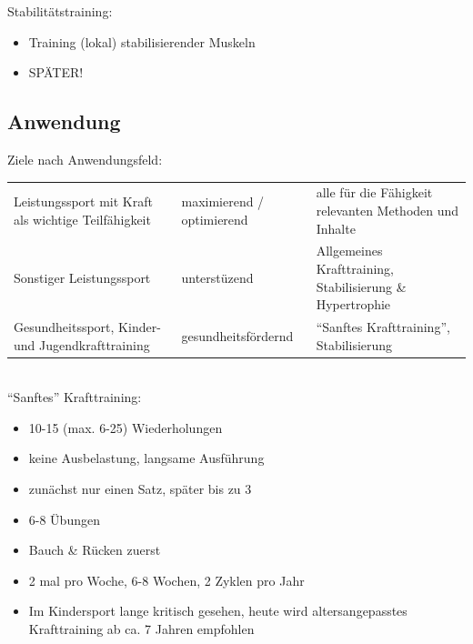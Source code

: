 Stabilitätstraining:
\begin{itemize}
    \item Training (lokal) stabilisierender Muskeln
    \item SPÄTER!
\end{itemize}

\subsection{Anwendung}
Ziele nach Anwendungsfeld: \\

\begin{tabular}{m{} | m{} |  m{}}
    Leistungssport mit Kraft als wichtige Teilfähigkeit & maximierend / \newline optimierend & alle für die Fähigkeit relevanten Methoden und Inhalte \\
    Sonstiger Leistungssport & unterstüzend & Allgemeines Krafttraining, Stabilisierung \& Hypertrophie \\
    Gesundheitssport, Kinder- und Jugendkrafttraining & gesundheitsfördernd & ``Sanftes Krafttraining'', Stabilisierung \\
\end{tabular}
\\

``Sanftes'' Krafttraining:
\begin{itemize}
    \item 10-15 (max. 6-25) Wiederholungen
    \item keine Ausbelastung, langsame Ausführung
    \item zunächst nur einen Satz, später bis zu 3
    \item 6-8 Übungen
    \item Bauch \& Rücken zuerst
    \item 2 mal pro Woche, 6-8 Wochen, 2 Zyklen pro Jahr
    \item Im Kindersport lange kritisch gesehen, heute wird altersangepasstes Krafttraining ab ca. 7 Jahren empfohlen
\end{itemize}

